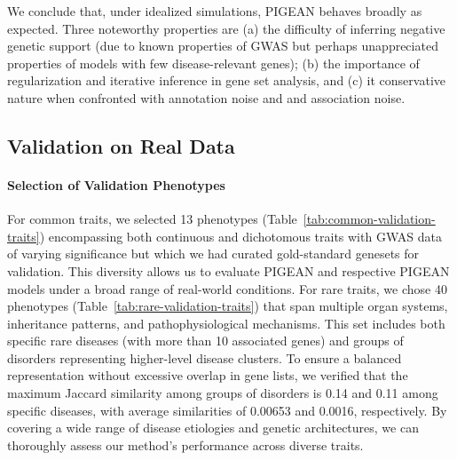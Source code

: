 We conclude that, under idealized simulations, PIGEAN behaves broadly as expected. Three noteworthy properties are (a) the difficulty of inferring negative genetic support (due to known properties of GWAS but perhaps unappreciated properties of models with few disease-relevant genes); (b) the importance of regularization and iterative inference in gene set analysis, and (c) it conservative nature when confronted with annotation noise and and association noise.

\subsection{Validation on Real Data}
\paragraph{Selection of Validation Phenotypes}
For common traits, we selected 13 phenotypes (Table~\ref{tab:common-validation-traits}) encompassing both continuous and dichotomous traits with GWAS data of varying significance but which we had curated gold-standard genesets for validation. This diversity allows us to evaluate PIGEAN and respective PIGEAN models under a broad range of real-world conditions. For rare traits, we chose 40 phenotypes (Table~\ref{tab:rare-validation-traits}) that span multiple organ systems, inheritance patterns, and pathophysiological mechanisms. This set includes both specific rare diseases (with more than 10 associated genes) and groups of disorders representing higher-level disease clusters. To ensure a balanced representation without excessive overlap in gene lists, we verified that the maximum Jaccard similarity among groups of disorders is 0.14 and 0.11 among specific diseases, with average similarities of 0.00653 and 0.0016, respectively. By covering a wide range of disease etiologies and genetic architectures, we can thoroughly assess our method's performance across diverse traits.



